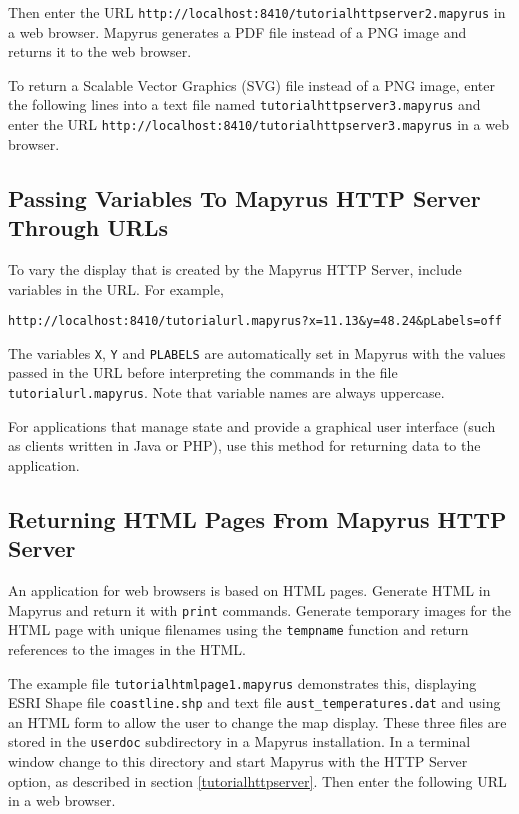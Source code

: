 

Then enter the URL \texttt{http://localhost:8410/tutorialhttpserver2.mapyrus}
in a web browser.  Mapyrus generates a PDF file instead of a PNG image and
returns it to the web browser.

To return a Scalable Vector Graphics (SVG) file instead of a PNG image,
enter the following lines into a text file named
\texttt{tutorialhttpserver3.mapyrus} and enter the URL
\texttt{http://localhost:8410/tutorialhttpserver3.mapyrus}
in a web browser.



\subsection{Passing Variables To Mapyrus HTTP Server Through URLs}
\label{urlvariables}

To vary the display that is created by the Mapyrus HTTP Server, include
variables in the URL.  For example,

\begin{verbatim}
http://localhost:8410/tutorialurl.mapyrus?x=11.13&y=48.24&pLabels=off
\end{verbatim}

The variables \texttt{X}, \texttt{Y}
and \texttt{PLABELS} are automatically set in Mapyrus with the values
passed in the URL before interpreting
the commands in the file \texttt{tutorialurl.mapyrus}.
Note that variable names are always uppercase.

For applications that manage state
and provide a graphical user interface (such as clients written in
Java or PHP), use this method for returning data to the
application.

\subsection{Returning HTML Pages From Mapyrus HTTP Server}

An application for web browsers is based on HTML pages.
Generate HTML in Mapyrus and return it with \texttt{print} commands.
Generate temporary images for the HTML page with
unique filenames using the
\texttt{tempname}
function and return references to the images in the HTML.

The example file \texttt{tutorialhtmlpage1.mapyrus} demonstrates
this, displaying ESRI Shape file
\texttt{coastline.shp}
and text file
\texttt{aust\_temperatures.dat}
and using an HTML form to allow
the user to change the map display.
These three files are stored in the \texttt{userdoc} subdirectory
in a Mapyrus installation.
In a terminal window change to this directory and
start Mapyrus with the HTTP Server option, as described in section
\ref{tutorialhttpserver}.
Then enter the following URL in a web browser.

